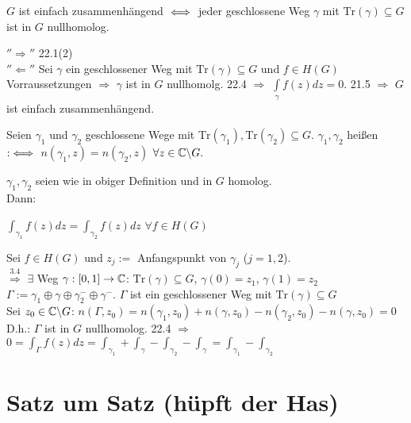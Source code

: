 \documentclass[a4paper,twoside,DIV15,BCOR12mm]{scrbook}
\def\Tr{\text{Tr}}
\def\wegint{\ensuremath{\int\limits_\gamma}}
\begin{document}
\begin{satz}
$G$ ist einfach zusammenhängend $\iff$ jeder geschlossene Weg $\gamma$ mit
$\Tr(\gamma) \subseteq G$ ist in $G$ nullhomolog.
\end{satz}
\begin{beweis}
$''\Rightarrow''$ 22.1(2) \\
$''\Leftarrow''$ Sei $\gamma$ ein geschlossener Weg mit $\Tr(\gamma) \subseteq
G$ und $f \in H(G)$ \\
Vorraussetzungen $\Rightarrow$ $\gamma$ ist in $G$ nullhomolg. 22.4
$\Rightarrow$ $\wegint f(z) dz = 0$. 21.5 $\Rightarrow$ $G$ ist einfach zusammenhängend.
\end{beweis}
\begin{definition}
Seien $\gamma_1$ und $\gamma_2$ geschlossene Wege mit $\Tr(\gamma_1),
\Tr(\gamma_2) \subseteq G.$ $\gamma_1, \gamma_2$ heißen 
$:\iff$ $n(\gamma_1,z) = n(\gamma_2, z)$ $\forall z \in \mathbb{C} \backslash G.$
\end{definition}
\begin{satz} 
$\gamma_1, \gamma_2$ seien wie in obiger Definition und in $G$ homolog. \\
Dann: \\ 
\centerline{$\int_{\gamma_1} f(z) dz = \int_{\gamma_2} f(z) dz$ $\forall f \in
H(G)$}
\end{satz}
\begin{beweis}
Sei $f \in H(G)$ und $z_j :=$ Anfangspunkt von $\gamma_j$ ($j=1,2$). \\
$\stackrel{\text{3.4}}{\Rightarrow}$ $\exists$ Weg $\gamma: [0,1] \to \mathbb{C}$:
$\Tr(\gamma) \subseteq G$, $\gamma(0) = z_1$, $\gamma(1) = z_2$ \\
$\Gamma := \gamma_1 \oplus \gamma \oplus \gamma_2^- \oplus \gamma^-$.
$\Gamma$ ist ein geschlossener Weg mit $\Tr(\gamma) \subseteq G$ \\
Sei $z_0 \in \mathbb{C} \backslash G$: $n(\Gamma, z_0) = n(\gamma_1, z_0)+ n(\gamma,
z_0) - n(\gamma_2,z_0) - n(\gamma,z_0) = 0$ \\
D.h.: $\Gamma$ ist in $G$ nullhomolog. 22.4 $\Rightarrow$ $0 = \int_\Gamma f(z)
dz = \int_{\gamma_1}+\int_{\gamma}-\int_{\gamma_2}-\int_{\gamma} = \int_{\gamma_1}-\int_{\gamma_2}$
\end{beweis}

\appendix
\chapter{Satz um Satz (hüpft der Has)}

\renewcommand{\indexname}{Stichwortverzeichnis}
\printindex
\end{document}
